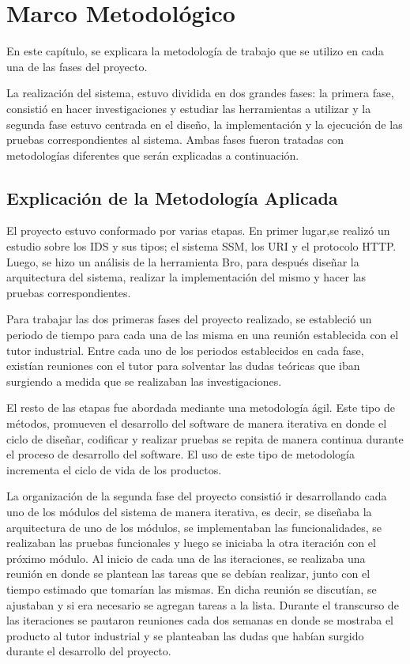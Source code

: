 \chapter{Marco Metodológico}
\label{capituloMetodologico}

En este capítulo, se explicara la metodología de trabajo que se utilizo en cada una de las fases del proyecto. 

La realización del sistema, estuvo dividida en dos grandes fases: la primera fase, consistió en hacer investigaciones y estudiar las herramientas a utilizar y la segunda fase estuvo centrada en el diseño, la implementación y la ejecución de las pruebas correspondientes al  sistema. Ambas fases fueron tratadas con metodologías diferentes que serán explicadas a continuación.

\section{Explicación de la Metodología Aplicada}


El proyecto estuvo conformado por varias etapas. En primer lugar,se realizó un estudio sobre los IDS y sus tipos; el sistema SSM, los URI y el protocolo HTTP. Luego, se hizo un análisis de la herramienta Bro, para después diseñar la arquitectura del sistema, realizar la implementación del mismo y hacer las pruebas correspondientes.

Para trabajar las dos primeras fases del proyecto realizado, se estableció un periodo de tiempo para cada una de las misma en una reunión establecida con el tutor industrial.
Entre cada uno de los periodos establecidos en cada fase, existían reuniones con el tutor para solventar las dudas teóricas que iban surgiendo a medida que se realizaban las investigaciones.

El resto de las etapas fue abordada mediante una metodología ágil. Este tipo de métodos,  promueven el desarrollo del software de manera iterativa en donde el ciclo de diseñar, codificar y realizar pruebas se repita de manera continua durante el proceso de desarrollo del software. El uso de este tipo de metodología incrementa el ciclo de vida de los productos\cite{agil}.

La organización de la segunda fase del proyecto consistió ir desarrollando cada uno de los módulos del sistema de manera iterativa, es decir, se diseñaba la arquitectura de uno de los módulos, se implementaban las funcionalidades, se realizaban las pruebas funcionales y luego se iniciaba la otra iteración con el próximo módulo. Al inicio de cada una de las iteraciones, se realizaba una reunión en donde se plantean las tareas que se debían realizar, junto con el tiempo estimado que tomarían las mismas. En dicha reunión se discutían, se ajustaban y si era necesario se agregan tareas a la lista.  Durante el transcurso de las  iteraciones se pautaron reuniones cada dos semanas en donde se mostraba el producto al tutor industrial y se planteaban las dudas que habían surgido durante el desarrollo del proyecto.

